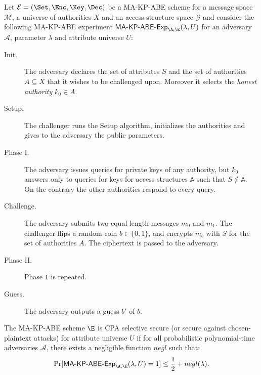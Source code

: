   \noindent Let $\mathcal{E}=(\Set,\Enc,\Key,\Dec)$ be a MA-KP-ABE scheme for a message space $\mathcal M$, a universe of authorities $X$ and an access structure space $\mathcal{G}$ and consider the following MA-KP-ABE experiment $\mathsf{MA}$-$\mathsf{KP}$-$\mathsf{ABE}$-$\mathsf{Exp}_{\A,\E}(\lambda,U)$  for an adversary $\mathcal A$, parameter $\lambda$ and attribute universe $U$:
 \begin{description}
      \item [Init.]
        The adversary declares the set of attributes $S$ and the set of authorities $A \subseteq X$ that it wishes to be challenged upon. Moreover it selects the \textit{honest authority} $k_0 \in A$.
      \item [Setup.]
        The challenger runs the Setup algorithm, initializes the authorities and gives to the adversary the public parameters.
      \item [Phase I.]
        The adversary issues queries for private keys of any authority, but $k_0$ answers only to queries for keys for access structures $\mathbb{A}$ such that $S \notin \mathbb{A}$.
        On the contrary the other authorities respond to every query.
      \item [Challenge.]
        The adversary submits two equal length messages $m_0$ and $m_1$.
        The challenger flips a random coin $b \in \{0, 1\}$, and encrypts $m_b$ with $S$ for the set of authorities $A$.
        The ciphertext is passed to the adversary.
      \item [Phase II.]
        Phase \texttt{I} is repeated.
      \item [Guess.]
        The adversary outputs a guess $b'$ of $b$.
  \end{description}


  \begin{definition}
  The MA-KP-ABE scheme $\E$ is  CPA selective secure (or secure against   chosen-plaintext attacks) for attribute universe $U$ if for all probabilistic polynomial-time adversaries $\mathcal A$, there exists a negligible function $negl$ such that:
  $$\Pr[\mathsf{MA}\mbox{-}\mathsf{KP}\mbox{-}\mathsf{ABE}\mbox{-}\mathsf{Exp}_{\A,\E}(\lambda,U) = 1] \leq \frac{1}{2} + negl(\lambda).$$
  \end{definition}

